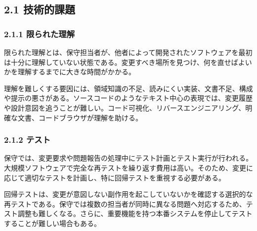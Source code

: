 \documentclass[a4paper,11pt]{ltjsarticle}
\begin{document}
\subsection{2.1 技術的課題}
\subsubsection{2.1.1 限られた理解}
限られた理解とは、保守担当者が、他者によって開発されたソフトウェアを最初は十分に理解していない状態である。変更すべき場所を見つけ、何を直せばよいかを理解するまでに大きな時間がかかる。\par
理解を難しくする要因には、領域知識の不足、読みにくい実装、文書不足、構成や提示の悪さがある。ソースコードのようなテキスト中心の表現では、変更履歴や設計意図を追うことが難しい。コード可視化、リバースエンジニアリング、明確な文書、コードブラウザが理解を助ける。\par
\subsubsection{2.1.2 テスト}
保守では、変更要求や問題報告の処理中にテスト計画とテスト実行が行われる。大規模ソフトウェアで完全な再テストを繰り返す費用は高い。そのため、変更に応じて適切なテストを計画し、特に回帰テストを重視する必要がある。\par
回帰テストは、変更が意図しない副作用を起こしていないかを確認する選択的な再テストである。保守では複数の担当者が同時に異なる問題へ対応するため、テスト調整も難しくなる。さらに、重要機能を持つ本番システムを停止してテストすることが難しい場合もある。\par
\end{document}
